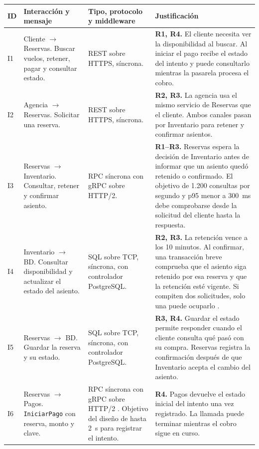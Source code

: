 \documentclass[11pt,a4paper]{article}
\newcommand{\flecha}{\(\to\)}
\begin{document}
{\small
\begin{longtable}{@{}P{0.75cm}P{4.25cm}P{4.1cm}P{7.2cm}@{}}
\toprule
\textbf{ID} & \textbf{Interacción y mensaje} & \textbf{Tipo, protocolo y middleware} & \textbf{Justificación} \\
\midrule
\endhead
\bottomrule
\endfoot
I1 & Cliente \flecha{} Reservas. Buscar vuelos, retener, pagar y consultar estado.
& REST sobre HTTPS, síncrona.
& \textbf{R1, R4.} El cliente necesita ver la disponibilidad al buscar. Al iniciar el pago recibe el estado del intento y puede consultarlo mientras la pasarela procesa el cobro. \\
\addlinespace
I2 & Agencia \flecha{} Reservas. Solicitar una reserva.
& REST sobre HTTPS, síncrona.
& \textbf{R2, R3.} La agencia usa el mismo servicio de Reservas que el cliente. Ambos canales pasan por Inventario para retener y confirmar asientos. \\
\addlinespace
I3 & Reservas \flecha{} Inventario. Consultar, retener y confirmar asiento.
& RPC síncrona con gRPC sobre HTTP/2.
& \textbf{R1–R3.} Reservas espera la decisión de Inventario antes de informar que un asiento quedó retenido o confirmado. El objetivo de 1.200 consultas por segundo y p95 menor a 300~ms \cite{enunciado} debe comprobarse desde la solicitud del cliente hasta la respuesta. \\
\addlinespace
I4 & Inventario \flecha{} BD. Consultar disponibilidad y actualizar el estado del asiento.
& SQL sobre TCP, síncrona, con controlador PostgreSQL.
& \textbf{R2, R3.} La retención vence a los 10 minutos. Al confirmar, una transacción breve comprueba que el asiento siga retenido por esa reserva y que la retención esté vigente. Si compiten dos solicitudes, solo una puede ocuparlo \cite[sec. 13.3.2]{postgres}. \\
\addlinespace
I5 & Reservas \flecha{} BD. Guardar la reserva y su estado.
& SQL sobre TCP, síncrona, con controlador PostgreSQL.
& \textbf{R3, R4.} Guardar el estado permite responder cuando el cliente consulta qué pasó con su compra. Reservas registra la confirmación después de que Inventario acepta el cambio del asiento. \\
\addlinespace
I6 & Reservas \flecha{} Pagos. \texttt{IniciarPago} con reserva, monto y clave.
& RPC síncrona con gRPC sobre HTTP/2 \cite{grpc}. Objetivo del diseño de hasta 2~s para registrar el intento.
& \textbf{R4.} Pagos devuelve el estado inicial del intento una vez registrado. La llamada puede terminar mientras el cobro sigue en curso. \\

\end{longtable}}
\end{document}
